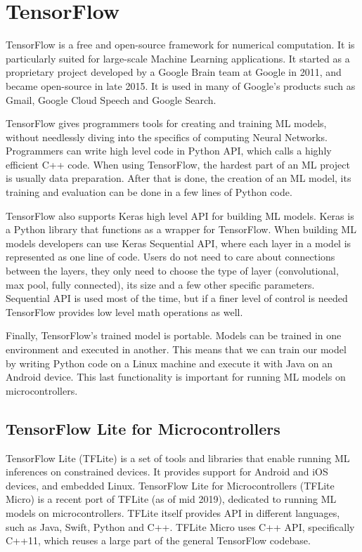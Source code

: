 \section{ TensorFlow}

TensorFlow is a free and open-source framework for numerical computation.
It is particularly suited for large-scale Machine Learning applications\cite{geron}.
It started as a proprietary project developed by a Google Brain team at Google in 2011, and became open-source in late 2015.
It is used in many of Google's products such as Gmail, Google Cloud Speech and Google Search.

TensorFlow gives programmers tools for creating and training ML models, without needlessly diving into the specifics of computing Neural Networks.
Programmers can write high level code in Python API, which calls a highly efficient C++ code.
When using TensorFlow, the hardest part of an ML project is usually data preparation.
After that is done, the creation of an ML model, its training and evaluation can be done in a few lines of Python code.

TensorFlow also supports Keras high level API for building ML models. 
Keras is a Python library that functions as a wrapper for TensorFlow.
When building ML models developers can use Keras Sequential API, where each layer in a model is represented as one line of code.
Users do not need to care about connections between the layers, they only need to choose the type of layer (convolutional, max pool, fully connected), its size and a few other specific parameters.
Sequential API is used most of the time, but if a finer level of control is needed TensorFlow provides low level math operations as well.

Finally, TensorFlow's trained model is portable\cite{geron}.
Models can be trained in one environment and executed in another.
This means that we can train our model by writing Python code on a Linux machine and execute it with Java on an Android device.
This last functionality is important for running ML models on microcontrollers.

\subsection{ TensorFlow Lite for Microcontrollers} \label{tflite_quant}

TensorFlow Lite (TFLite) is a set of tools and libraries that enable running ML inferences on constrained devices\cite{tensorflow_github}.
It provides support for Android and iOS devices, and embedded Linux.
TensorFlow Lite for Microcontrollers (TFLite Micro) is a recent port of TFLite (as of mid 2019), dedicated to running ML models on microcontrollers.
TFLite itself provides API in different languages, such as Java, Swift, Python and C++.
TFLite Micro uses C++ API, specifically C++11, which reuses a large part of the general TensorFlow codebase.

